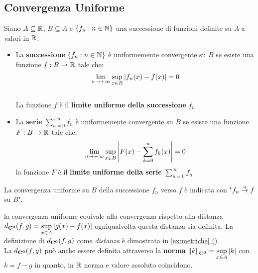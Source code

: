 \subsection{Convergenza Uniforme}\label{sect:conv_unif}
\begin{definition}
	\label{def:conv_unif}
	Siano $A\subseteq \mathbb{R}$, $B\subseteq A$ e $\left\{f_n:n\in\mathbb{N}\right\}$ una successione di funzioni definite su $A$ a valori in $\mathbb{R}$.
	\begin{itemize}
		\item La \textbf{successione} $\left\{f_n:n\in \mathbb{N}\right\}$ è uniformemente convergente su $B$ se esiste una funzione $f:B\to \mathbb{R}$ tale che:
		\[\lim\limits_{n \to +\infty} \sup\limits_{x\in B}\left|f_n(x)-f(x)\right|=0\]\\
		La funzione $f$ è il \textbf{limite uniforme della successione} $f_n$
		\item La \textbf{serie} $\sum\limits_{n=0}^{+\infty}f_n$ è uniformemente convergente su $B$ se esiste una funzione $F:B\to \mathbb{R}$ tale che:
		\[\lim\limits_{n\to +\infty} \sup\limits_{x\in B}\left|F(x)-\sum\limits_{k=0}^n f_k(x)\right|=0\]
		la funzione $F$ è il \textbf{limite uniforme della serie} $\sum\limits_{n=0}^{\infty}f_n$
	\end{itemize}
	La convergenza uniforme su $B$ della successione $f_n$ verso $f$ è indicata con "$f_n \overset{\text{u}}{\to} f$ su $B$".
\end{definition}
\begin{observation}
	\label{obs:dist_conv_unif}
	la convergenza uniforme equivale alla convergenza rispetto alla distanza $d_{\mathbf{C^{0}}}(f,g)=\sup\limits_{x\in A}\left|g(x)-f(x)\right|$ ogniqualvolta questa distanza sia definita. La definizione di $d_{\mathbf{C^{0}}}(f,g)$ come \textit{distanza} è dimostrata in \hyperref[ex:dim_dist_conv_unif]{\cref*{ex:metriche} ()}\\
	La $d_{\mathbf{C^{0}}}(f,g)$ può anche essere definita attraverso la \textbf{norma} $\left\|k\right\|_{\mathbf{C^{0}}}=\sup\limits_{x\in A}\left|k\right|$ con $k = f-g$ in quanto, in $\mathbb{R}$ norma e valore assoluto coincidono.
\end{observation}
\begin{proposition}
	\label{prop:dist_lin_non_cont}
\end{proposition}
\begin{example}
	\label{ex:BBBBBBBBBB}
\end{example}


